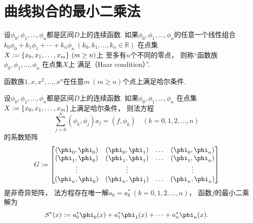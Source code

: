 \section{曲线拟合的最小二乘法}
\begin{definition}
设\(\phi_0,\phi_1,\dotsc,\phi_n\)都是区间\(D\)上的连续函数.
如果\(\phi_0,\phi_1,\dotsc,\phi_n\)的任意一个线性组合
\(
	k_0 \phi_0 + k_1 \phi_1 + \dotsb + k_n \phi_n
	\ (k_0,k_1,\dotsc,k_n \in \mathbb{R})
\)
在点集\(X := \{x_0,x_1,\dotsc,x_m\}\ (m \geq n)\)上
至多有\(n\)个不同的零点，
则称“函数族\(\phi_0,\phi_1,\dotsc,\phi_n\)
在点集\(X\)上
满足（Haar condition）”.
\end{definition}

\begin{proposition}
函数族\(1,x,x^2,\dotsc,x^n\)在任意\(m\ (m \geq n)\)个点上满足哈尔条件.
\end{proposition}

\begin{proposition}
设\(\phi_0,\phi_1,\dotsc,\phi_n\)都是区间\(D\)上的连续函数.
如果\(\phi_0,\phi_1,\dotsc,\phi_n\)
在点集\(X := \{x_0,x_1,\dotsc,x_m\}\)上满足哈尔条件，
则法方程\begin{equation*}
	\sum_{j=0}^n (\phi_k,\phi_j) a_j = (f,\phi_k)
	\quad(k=0,1,2,\dotsc,n)
\end{equation*}
的系数矩阵\begin{equation*}
	G \defeq \begin{bmatrix}
		(\phi_0,\phi_0) & (\phi_0,\phi_1) & \dots & (\phi_0,\phi_n) \\
		(\phi_1,\phi_0) & (\phi_1,\phi_1) & \dots & (\phi_1,\phi_n) \\
		\vdots & \vdots & & \vdots \\
		(\phi_n,\phi_0) & (\phi_n,\phi_1) & \dots & (\phi_n,\phi_n) \\
	\end{bmatrix}
\end{equation*}
是非奇异矩阵，
法方程存在唯一解\(a_k = a^*_k\ (k=0,1,2,\dotsc,n)\)，
函数\(f\)的最小二乘解为\begin{equation*}
	S^*(x) \defeq a^*_0 \phi_0(x) + a^*_1 \phi_1(x) + \dotsb + a^*_n \phi_n(x).
\end{equation*}
\end{proposition}
